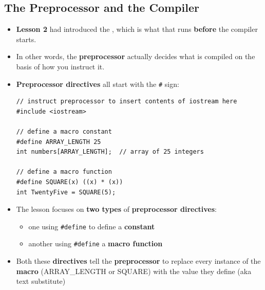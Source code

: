 \documentclass[10pt]{article}
\begin{document}
\subsection{The Preprocessor and the Compiler}
\begin{itemize}
	\item \textbf{Lesson 2} had introduced the , which is what that runs \textbf{before} the compiler starts.

	\item In other words, the \textbf{preprocessor} actually decides what is compiled on the basis of how you instruct it.

	\item \textbf{Preprocessor directives} all start with the \verb|#| sign:

		\begin{verbatim}
// instruct preprocessor to insert contents of iostream here
#include <iostream>

// define a macro constant
#define ARRAY_LENGTH 25
int numbers[ARRAY_LENGTH];	// array of 25 integers

// define a macro function
#define SQUARE(x) ((x) * (x))
int TwentyFive = SQUARE(5);
		\end{verbatim}

	\item The lesson focuses on \textbf{two types} of \textbf{preprocessor directives}:
		\begin{itemize}
			\item one using \verb|#define| to define a \textbf{constant}
			\item another using \verb|#define| a \textbf{macro function}
		\end{itemize}

	\item Both these \textbf{directives} tell the \textbf{preprocessor} to replace every instance of the \textbf{macro} (ARRAY\_LENGTH or SQUARE) with the value they define (aka text substitute)
\end{itemize}

\newpage
\end{document}
